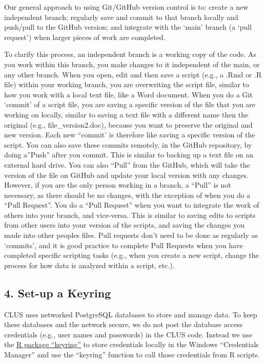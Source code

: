 \documentclass[
]{article}
\begin{document}
Our general approach to using Git/GitHub version control is to: create a
new independent branch; regularly save and commit to that branch locally
and push/pull to the GitHub version; and integrate with the `main'
branch (a `pull request') when larger pieces of work are completed.

To clarify this process, an independent branch is a working copy of the
code. As you work within this branch, you make changes to it independent
of the main, or any other branch. When you open, edit and then save a
script (e.g., a .Rmd or .R file) within your working branch, you are
overwriting the script file, similar to how you work with a local text
file, like a Word document. When you do a Git `commit' of a script file,
you are saving a specific version of the file that you are working on
locally, similar to saving a text file with a different name then the
original (e.g., file\_version2.doc), because you want to preserve the
original and new version. Each new ``commit' is therefore like saving a
specific version of the script. You can also save these commits
remotely, in the GitHub repository, by doing a''Push'' after you commit.
This is similar to backing up a text file on an external hard drive. You
can also ``Pull'' from the GitHub, which will take the version of the
file on GitHub and update your local version with any changes. However,
if you are the only person working in a branch, a ``Pull'' is not
necessary, as there should be no changes, with the exception of when you
do a ``Pull Request''. You do a ``Pull Request'' when you want to
integrate the work of others into your branch, and vice-versa. This is
similar to saving edits to scripts from other users into your version of
the scripts, and saving the changes you made into other peoples files.
Pull requests don't need to be done as regularly as `commits', and it is
good practice to complete Pull Requests when you have completed specific
scripting tasks (e.g., when you create a new script, change the process
for how data is analyzed within a script, etc.).

\hypertarget{set-up-a-keyring}{%
\subsection{4. Set-up a Keyring}\label{set-up-a-keyring}}

CLUS uses networked PostgreSQL databases to store and manage data. To
keep these databases and the network secure, we do not post the database
access credentials (e.g., user names and passwords) in the CLUS code.
Instead we use the
\href{https://cran.r-project.org/web/packages/keyring/keyring.pdf}{R
package ``keyring''} to store credentials locally in the Windows
``Credentials Manager'' and use the ``keyring'' function to call those
credentials from R scripts.
\end{document}
